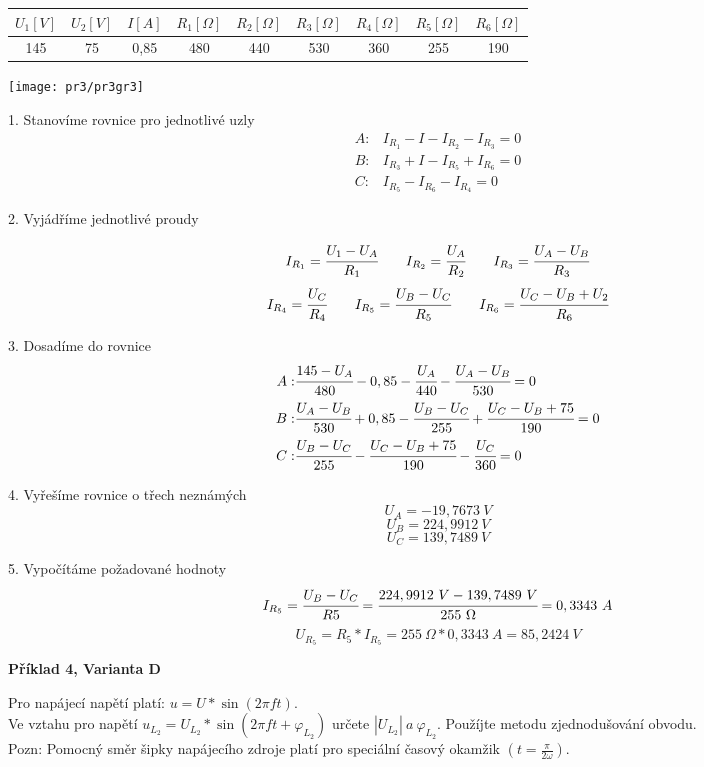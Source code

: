 \documentclass[a4paper,12pt]{article}
\begin{document}
\begin{tabular} {| c | c | c | c | c | c | c | c | c | }
\hline
 $U_1[V]$
&$U_2[V]$
&$I[A]$
&$R_1[\Omega]$
&$R_2[\Omega]$
&$R_3[\Omega]$
&$R_4[\Omega]$
&$R_5[\Omega]$
&$R_6[\Omega]$
\\ \hline

145 & 75 & 0,85 & 480 & 440 & 530 & 360 & 255 & 190 \\ \hline

\end{tabular}

\begin{center}
\texttt{[image: pr3/pr3gr3]}
\end{center}

1. Stanovíme rovnice pro jednotlivé uzly
\begin{align*}
A :& I_{R_1} - I - I_{R_2} - I_{R_3} = 0\\
B :& I_{R_3} + I - I_{R_5} + I_{R_6} = 0\\
C :& I_{R_5} - I_{R_6} - I_{R_4} = 0
\end{align*}

2. Vyjádříme jednotlivé proudy

$$
I_{R_1} = \cfrac{U_1 - U_A}{R_1}\qquad
I_{R_2} = \cfrac{U_A}{R_2}\qquad
I_{R_3} = \cfrac{U_A - U_B}{R_3}
$$
$$
I_{R_4} = \cfrac{U_C}{R_4}\qquad
I_{R_5} = \cfrac{U_B - U_C}{R_5}\qquad
I_{R_6} = \cfrac{U_C - U_B + U_2}{R_6}
$$

3. Dosadíme do rovnice
\begin{align*}
A :& \cfrac{145 - U_A}{480} - 0,85 - \cfrac{U_A}{440} - \cfrac{U_A - U_B}{530} = 0\\
B :& \cfrac{U_A - U_B}{530} + 0,85 - \cfrac{U_B - U_C}{255} + \cfrac{U_C - U_B + 75}{190} = 0\\
C :& \cfrac{U_B - U_C}{255} - \cfrac{U_C - U_B + 75}{190} - \cfrac{U_C}{360} = 0
\end{align*}


4. Vyřešíme rovnice o třech neznámých
\[U_A = -19,7673\ V\]
\[U_B = 224,9912\ V\]
\[U_C = 139,7489\ V\]

5. Vypočítáme požadované hodnoty
\[I_{R_5} = \cfrac{U_B - U_C}{R5} = \cfrac{224,9912\ V - 139,7489\ V}{255\ \Omega} = 0,3343\ A\]
\[U_{R_5} = R_5 * I_{R_5} = 255\ \Omega * 0,3343\ A = 85,2424\ V\]


\newpage

\begin{center}
\textbf{Příklad 4, Varianta D}
\end{center}
\bigskip
Pro napájecí napětí platí: $u = U * \sin (2\pi ft)$.\\
Ve vztahu pro napětí $u_{L_2} = U_{L_2} * \sin (2\pi ft + \varphi_{L_2})$ určete $|U_{L_2}|\ a\ \varphi_{L_2}$.
Použíjte metodu zjednodušování obvodu.\\
Pozn: Pomocný směr šipky napájecího zdroje platí pro speciální časový okamžik $(t = \frac{\pi}{2\omega})$.
\bigskip
\end{document}
